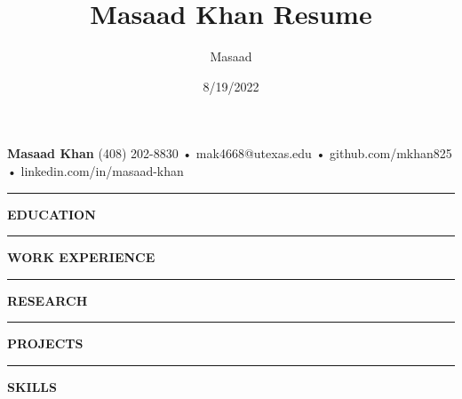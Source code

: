 \documentclass[12pt, a4paper]{article}
\title{Masaad Khan Resume}
\author{Masaad}
\date{8/19/2022}
\newcommand\jobDist{-2 mm}
\newcommand\titleheadersize{11}
\begin{document}
%
%
{\fontsize{20}{24}\selectfont \textbf{\hfil Masaad Khan \hfil}}\newline\vspace{-5mm}\newline
{\fontsize{\titleheadersize}{14}}\newline\vspace{-6mm}\newline
{\fontsize{\titleheadersize}{14}\selectfont \hspace*{0mm}\hfil (408) 202-8830 • mak4668@utexas.edu • github.com/mkhan825 • linkedin.com/in/masaad-khan \hfil}\newline\vspace{-9mm}\newline
%
%
\rule{19.5cm}{0.4pt}\vspace{-0.75mm}\newline
\noindent\textbf{{\fontsize{12}{14}\selectfont EDUCATION}}
\vspace{-1mm}\newline

\vspace{-1mm}
%
%
\noindent\rule{19.5cm}{0.4pt}
\noindent\textbf{{\fontsize{12}{14}\selectfont WORK EXPERIENCE}}
\vspace{-0.25mm}\newline
%
%

\vspace{\jobDist}

\vspace{\jobDist}

\vspace{-1mm}
%
%
\noindent\rule{19.5cm}{0.4pt}
\noindent\textbf{{\fontsize{12}{14}\selectfont RESEARCH}}\newline
\vspace{-5.5mm}\newline
%

\vspace{-1mm}
%
%
\noindent\rule{19.5cm}{0.4pt}
\noindent\textbf{{\fontsize{12}{14}\selectfont PROJECTS}}\newline
\vspace{-5.5mm}\newline
%
%

\vspace{-4mm}\newline
%
%

\vspace{-4mm}
%
%

\vspace{-0.8cm}\newline
\vspace{-1mm}
%
%
\noindent\rule{19.5cm}{0.4pt}
\noindent\textbf{{\fontsize{12}{14}\selectfont SKILLS}}\newline

\vspace{0cm}
%
%
\end{document}
